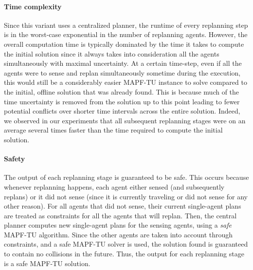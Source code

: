 \documentclass[jair,twoside,11pt,theapa]{article}
\newcommand{\mapftu}{MAPF-TU\xspace}
\begin{document}
\paragraph{Time complexity} Since this variant uses a centralized planner, the runtime of every replanning step is in the worst-case exponential in the number of replanning agents. 
However, the overall computation time is typically dominated by the time it takes to compute the initial solution since it always takes into consideration all the agents simultaneously with maximal uncertainty.
At a certain time-step, even if all the agents were to sense and replan simultaneously sometime during the execution, this would still be a considerably easier \mapftu instance to solve compared to the initial, offline solution that was already found. 
This is because much of the time uncertainty is removed from the solution up to this point leading to fewer potential conflicts over shorter time intervals across the entire solution.
Indeed, we observed in our experiments that all subsequent replanning stages were on an average several times faster than the time required to compute the initial solution.

\paragraph{Safety}  
The output of each replanning stage is guaranteed to be safe. This occurs because whenever replanning happens, each agent either sensed (and subsequently replans) or it did not sense (since it is currently traveling or did not sense for any other reason). For all agents that did not sense, their current single-agent plans are treated as constraints for all the agents that will replan. Then, the central planner computes new single-agent plans for the sensing agents, using a \emph{safe} \mapftu algorithm. Since the other agents are taken into account through constraints, and a safe \mapftu solver is used, the solution found is guaranteed to contain no collisions in the future. Thus, the output for each replanning stage is a safe \mapftu solution.

\end{document}
